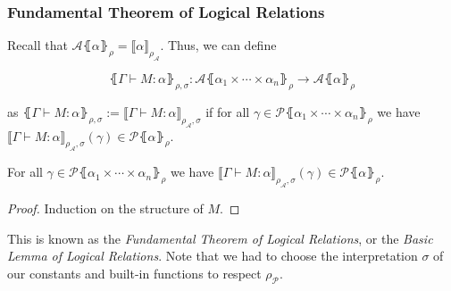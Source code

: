 \documentclass[aspectratio=169]{beamer}
\begin{document}
\begin{frame}
\frametitle{Fundamental Theorem of Logical Relations}

Recall that $\mathcal{A}\lBrace \alpha \rBrace_{\rho} = \llbracket\alpha \rrbracket_{\rho_{\mathcal{A}}}$.
Thus, we can define

\[
\lBrace \Gamma \vdash M : \alpha \rBrace_{\rho, \sigma} : \mathcal{A}\lBrace \alpha_1 \times \cdots \times \alpha_n \rBrace_\rho \to \mathcal{A}\lBrace \alpha \rBrace_\rho
\]

as $\lBrace \Gamma \vdash M : \alpha \rBrace_{\rho, \sigma} := \llbracket \Gamma \vdash M : \alpha \rrbracket_{\rho_{\mathcal{A}}, \sigma}$ if for all $\gamma \in \mathcal{P}\lBrace \alpha_1 \times \cdots \times \alpha_n \rBrace_\rho$ we have $\llbracket \Gamma \vdash M : \alpha \rrbracket_{\rho_{\mathcal{A}}, \sigma}(\gamma) \in \mathcal{P}\lBrace \alpha \rBrace_\rho$.

\medskip

\begin{theorem}
    For all $\gamma \in \mathcal{P}\lBrace \alpha_1 \times \cdots \times \alpha_n \rBrace_\rho$ we have $\llbracket \Gamma \vdash M : \alpha \rrbracket_{\rho_{\mathcal{A}}, \sigma}(\gamma) \in \mathcal{P}\lBrace \alpha \rBrace_\rho$.
    \begin{proof}
        Induction on the structure of $M$.
    \end{proof}
\end{theorem}

\medskip

This is known as the \emph{Fundamental Theorem of Logical Relations}, or the \emph{Basic Lemma of Logical Relations}.
Note that we had to choose the interpretation $\sigma$ of our constants and built-in functions to respect $\rho_{\mathcal{P}}$.
\end{frame}
\end{document}
